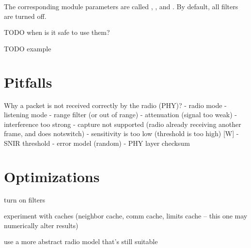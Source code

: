 The corresponding module parameters are called ,
,  and .
By default, all filters are turned off.

TODO when is it safe to use them?

TODO example

\section{Pitfalls}

Why a packet is not received correctly by the radio (PHY)?
- radio mode
- listening mode
- range filter (or out of range)
- attenuation (signal too weak)
- interference too strong
- capture not supported (radio already receiving another frame, and does notswitch)
- sensitivity is too low (threshold is too high) [W]
- SNIR threshold
- error model (random)
- PHY layer checksum



\section{Optimizations}

turn on filters

experiment with caches (neighbor cache, comm cache, limits cache -- this one
may numerically alter results) 

use a more abstract radio model that's still suitable


